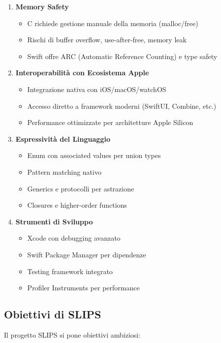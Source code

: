 \begin{enumerate}
\item \textbf{Memory Safety}
\begin{itemize}
\item C richiede gestione manuale della memoria (malloc/free)
\item Rischi di buffer overflow, use-after-free, memory leak
\item Swift offre ARC (Automatic Reference Counting) e type safety
\end{itemize}

\item \textbf{Interoperabilità con Ecosistema Apple}
\begin{itemize}
\item Integrazione nativa con iOS/macOS/watchOS
\item Accesso diretto a framework moderni (SwiftUI, Combine, etc.)
\item Performance ottimizzate per architetture Apple Silicon
\end{itemize}

\item \textbf{Espressività del Linguaggio}
\begin{itemize}
\item Enum con associated values per union types
\item Pattern matching nativo
\item Generics e protocolli per astrazione
\item Closures e higher-order functions
\end{itemize}

\item \textbf{Strumenti di Sviluppo}
\begin{itemize}
\item Xcode con debugging avanzato
\item Swift Package Manager per dipendenze
\item Testing framework integrato
\item Profiler Instruments per performance
\end{itemize}
\end{enumerate}

\subsection{Obiettivi di SLIPS}

Il progetto SLIPS si pone obiettivi ambiziosi:

